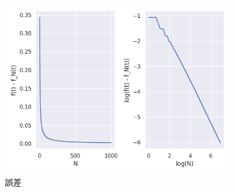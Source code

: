 \documentclass{jsarticle}
\begin{document}
\begin{figure}[htbp]
    \includegraphics[clip,width=10.0cm]{./fourier_error_case2.png}
    \caption{誤差}
    \label{f4}
\end{figure}
\end{document}
